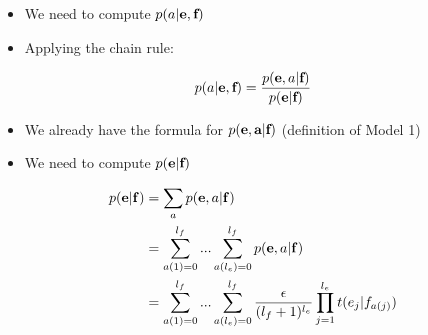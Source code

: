\documentclass[landscape]{slides}
\newcommand{\maths}[1]{\textcolor{purple}{#1}}
\begin{document}

\vspace{20mm}
\begin{itemize}
\item We need to compute \maths{$p(a|\mbox{\bf e},\mbox{\bf f})$}
\item Applying the chain rule:
\end{itemize}
\maths{\begin{equation*}
p(a|\mbox{\bf e},\mbox{\bf f}) =
\frac{p(\mbox{\bf e},a|\mbox{\bf f})}
{p(\mbox{\bf e}|\mbox{\bf f})}
\label{eqn:wb:p_a}
\end{equation*}}
\begin{itemize}
\item We already have the formula for \maths{$p(\mbox{\bf e},\mbox{\bf a}|\mbox{\bf f})$} (definition of Model 1)
\end{itemize}



\vspace{10mm}
\begin{itemize}
\item We need to compute \maths{$p(\mbox{\bf e}|\mbox{\bf f})$}
\end{itemize}
\maths{\begin{equation*}
\begin{split}
p({\bf e}|{\bf f}) &= \sum_a p({\bf e},a|{\bf f}) \\
&= \sum_{a(1)=0}^{l_f} ... \sum_{a(l_e)=0}^{l_f} p({\bf e},a|{\bf f})\\
&= \sum_{a(1)=0}^{l_f} ... \sum_{a(l_e)=0}^{l_f} 
\frac{\epsilon}{(l_f+1)^{l_e}} \prod_{j=1}^{l_e} t(e_j|f_{a(j)}) \\
\end{split}
\end{equation*}}


\end{document}
